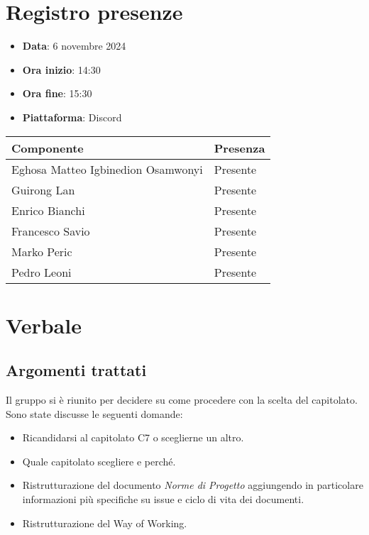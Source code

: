 \documentclass[a4paper, 12pt]{article}
\def\data-verbale{6 novembre 2024}
\begin{document}
\section{Registro presenze}
\begin{itemize}
    \item[] \textbf{Data}: \data-verbale
    \item[] \textbf{Ora inizio}:  14:30
    \item[] \textbf{Ora fine}: 15:30
    \item[] \textbf{Piattaforma}: Discord	
\end{itemize}
\begin{table}[!h]
\centering
{\renewcommand{\arraystretch}{2}
\begin{tabularx}{\textwidth}{| X | X |}
    \hline
        \textbf{\large Componente} & 
        \textbf{\large Presenza} \\ 
    \hline 
    \hline
        Eghosa Matteo Igbinedion Osamwonyi&
        Presente \\
    \hline 
        Guirong Lan&
        Presente \\
    \hline 
        Enrico Bianchi&
        Presente \\
    \hline 
        Francesco Savio&
        Presente \\
    \hline 
        Marko Peric&
        Presente \\
    \hline 
        Pedro Leoni&
        Presente \\
    \hline 

\end{tabularx}}
\end{table}

\newpage

\section{Verbale}
\subsection{Argomenti trattati}
Il gruppo si è riunito per decidere su come procedere con la scelta del capitolato. Sono state discusse le seguenti domande:
\begin{itemize}
    \item Ricandidarsi al capitolato C7 o sceglierne un altro.
    \item Quale capitolato scegliere e perché.
    \item Ristrutturazione del documento \textit{Norme di Progetto} aggiungendo in particolare informazioni più specifiche su issue e ciclo di vita dei documenti.
    \item Ristrutturazione del Way of Working.
\end{itemize}
\end{document}
